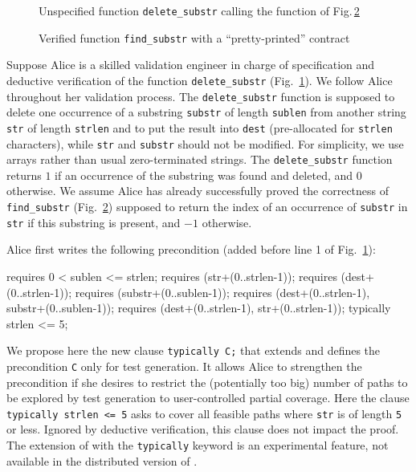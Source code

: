 \begin{figure}[t]
  
  \vspace{-3mm}
  \caption{Unspecified function \lstinline{delete_substr} calling the function of Fig.\,\ref{fig:findSubstr}}
  \vspace{-3mm}
  \label{fig:deleteSubstrTrous}
\end{figure}
\begin{figure}[t]
  
  \vspace{-3mm}
  \caption{Verified function \lstinline{find_substr} with a ``pretty-printed'' \eacsl contract}
  \vspace{-3mm}
  \label{fig:findSubstr}
\end{figure}

Suppose Alice is a skilled validation engineer in charge of specification 
and deductive verification of the function \lstinline{delete_substr} 
(Fig.~\ref{fig:deleteSubstrTrous}).
We follow Alice throughout her validation process.
The \lstinline{delete_substr}  function is supposed to delete one occurrence of
a substring \lstinline{substr} of length \lstinline{sublen} from another string
\lstinline{str} of length \lstinline{strlen}
and to put the result into \lstinline{dest} (pre-allocated 
for \lstinline{strlen} characters), while \lstinline{str} and \lstinline{substr}
should not be modified.
For simplicity, we use arrays rather than 
usual zero-terminated strings.
The \lstinline{delete_substr}  function returns $1$ if an occurrence of
the substring was found and deleted, and $0$ otherwise.
We assume Alice has already successfully proved the correctness of 
\lstinline{find_substr}  (Fig.~\ref{fig:findSubstr})
supposed to  return the index of an occurrence of \lstinline{substr}
in \lstinline{str} if this substring is present, and $-1$ otherwise. 

Alice first writes the following precondition (added before line 1 of Fig.~\ref{fig:deleteSubstrTrous}):
\begin{pretty-codeACSL}
requires 0 < sublen <= strlen;
requires \valid(str+(0..strlen-1));
requires \valid(dest+(0..strlen-1));
requires \valid(substr+(0..sublen-1));
requires \separated(dest+(0..strlen-1), substr+(0..sublen-1));
requires \separated(dest+(0..strlen-1), str+(0..strlen-1));
typically strlen <= 5;
\end{pretty-codeACSL}
We propose here the new clause \lstinline{typically C;} that extends \eacsl
and defines the  precondition \lstinline{C} only for test generation.
It allows Alice to strengthen the precondition if she desires to 
restrict the (potentially too big) number of paths
to be explored by test generation to user-controlled partial coverage. 
Here the clause 
\lstinline{typically strlen <= 5} asks to cover all feasible
paths where \lstinline{str} is of length \lstinline{5} or less.
Ignored by deductive verification, this clause does not impact the proof.
The extension of \acsl with the \lstinline'typically' keyword is an
experimental feature, not available in the distributed version of \framac.


